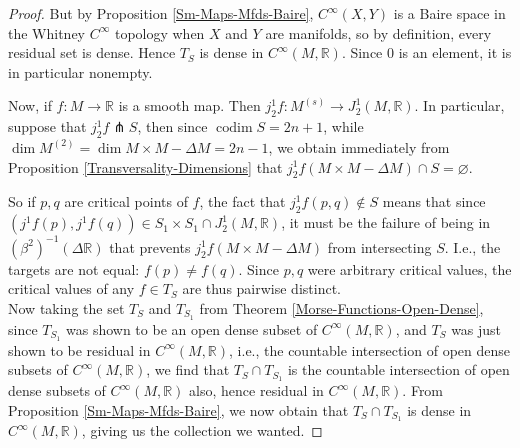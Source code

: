 \documentclass[reqno]{amsart}
\theoremstyle{definition}
\theoremstyle{remark}
\DeclareMathOperator{\codim}{codim}
\begin{document}
\begin{proof}
     But by Proposition \ref{Sm-Maps-Mfds-Baire},
     $C^{\infty}(X,Y)$ is a Baire space in the
     Whitney $C^{\infty}$ topology when
     $X$ and $Y$ are manifolds, so by
     definition, every residual set is dense. Hence
     $T_{S}$ is dense in
     $C^{\infty}(M,\mathbb{R})$. Since 
     $0$ is an element, it is in particular nonempty.

  Now, if $f \colon M \to \mathbb{R}$ is a smooth map.
  Then $j_2^{1}f \colon
  M^{(s)} \to J_2^{1}(M, \mathbb{R})$.
  In particular,
  suppose that $j_2^{1}f \pitchfork S$, then since 
  $\codim S = 2n+1$, while
  $\dim M^{(2)} = 
  \dim M \times M - \Delta M= 2n-1 $, we obtain immediately from
  Proposition \ref{Transversality-Dimensions} that
  $j_2^{1}f( M \times M - \Delta M) \cap S = \varnothing$.

  So if $p,q$ are critical points of
  $f$, the fact that
  $j_2^{1}f(p,q) \not\in  S$ means that
  since $\left( j^{1}f(p), j^{1}f(q) \right) 
  \in S_1 \times S_1 \cap J_2^{1}(M, \mathbb{R})$, it
  must be the failure of being in
  $\left( \beta^2 \right)^{-1}\left( \Delta \mathbb{R} \right) $ 
  that prevents $j_2^{1}f
  \left( M \times M- \Delta M \right) $  from intersecting
  $S$. I.e., the targets are not equal:
  $f(p) \neq f(q)$. Since $p,q$ were arbitrary
  critical values,
  the critical values of any
  $f \in T_S$ are thus pairwise distinct.\\

  Now taking the set
  $T_S$ and $T_{S_1}$ from Theorem \ref{Morse-Functions-Open-Dense},
  since $T_{S_1}$ was shown to be an open dense
  subset of $C^{\infty}(M,\mathbb{R})$, and
   $T_S$ was just shown to be
   residual in $C^{\infty}(M,\mathbb{R})$, i.e.,
   the countable intersection of open dense subsets
   of $C^{\infty}(M,\mathbb{R})$, we find that
   $T_S \cap T_{S_1}$ is the countable intersection of
   open dense subsets of $C^{\infty}(M,\mathbb{R})$ also,
   hence residual in $C^{\infty}(M,\mathbb{R})$.
   From Proposition \ref{Sm-Maps-Mfds-Baire}, we now obtain
   that $T_S \cap T_{S_1}$ is dense in
   $C^{\infty}(M,\mathbb{R})$, giving us
   the collection we wanted.






 \end{proof}
\end{document}
